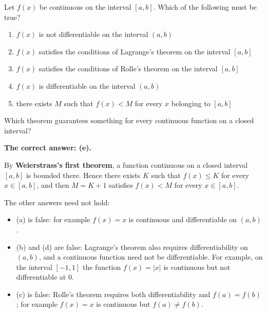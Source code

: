 
\begin{question}
Let $f(x)$ be continuous on the interval $[a,b]$. Which of the following must be true?
\begin{enumerate}
  \item[(a)] $f(x)$ is not differentiable on the interval $(a,b)$
  \item[(b)] $f(x)$ satisfies the conditions of Lagrange's theorem on the interval $[a,b]$
  \item[(c)] $f(x)$ satisfies the conditions of Rolle's theorem on the interval $[a,b]$
  \item[(d)] $f(x)$ is differentiable on the interval $(a,b)$
  \item[(e)] there exists $M$ such that $f(x)<M$ for every $x$ belonging to $[a,b]$
\end{enumerate}
\end{question}

\begin{hint}
Which theorem guarantees something for every continuous function on a closed interval?
\end{hint}

\begin{solution}
\textbf{The correct answer: (e).}

By \textbf{Weierstrass's first theorem}, a function continuous on a closed interval $[a,b]$ is bounded there. Hence there exists $K$ such that $f(x)\le K$ for every $x\in[a,b]$, and then $M=K+1$ satisfies $f(x)<M$ for every $x\in[a,b]$.

The other answers need not hold:
\begin{itemize}
  \item (a) is false: for example $f(x)=x$ is continuous and differentiable on $(a,b)$.
  \item (b) and (d) are false: Lagrange's theorem also requires differentiability on $(a,b)$, and a continuous function need not be differentiable. For example, on the interval $[-1,1]$ the function $f(x)=|x|$ is continuous but not differentiable at $0$.
  \item (c) is false: Rolle's theorem requires both differentiability and $f(a)=f(b)$; for example $f(x)=x$ is continuous but $f(a)\ne f(b)$.
\end{itemize}
\end{solution}
